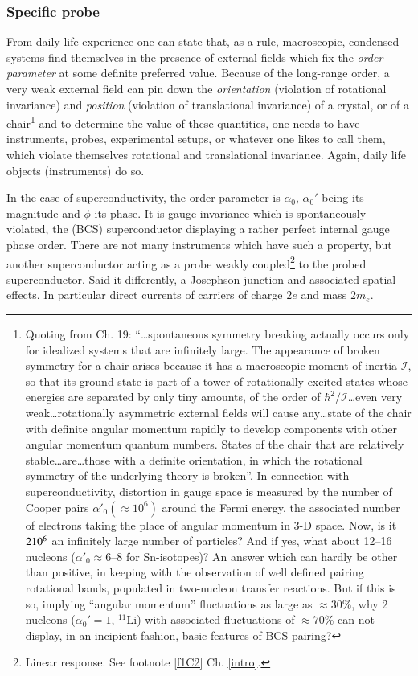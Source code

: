 \subsubsection{Specific probe}
From daily life experience one can state that, as a rule, macroscopic, condensed systems find themselves in the presence of external fields which fix the \textit{order parameter} at some definite preferred value. Because of the long-range order, a very weak external field can pin down the \textit{orientation} (violation of rotational invariance) and \textit{position} (violation of translational invariance) of a crystal, or of a chair\footnote{Quoting from \cite{Weinberg:96b} Ch. 19: ``\dots spontaneous symmetry breaking actually occurs only for idealized systems that are infinitely large. The appearance of broken symmetry for a chair arises because it has a macroscopic moment of inertia $\mathcal I$, so that its ground state is part of a tower of rotationally excited states whose energies are separated by only tiny amounts, of the order of $\hbar^2/\mathcal I$\dots even very weak\dots rotationally asymmetric external fields will cause any\dots state of the chair with definite angular momentum rapidly to develop components with other angular momentum quantum numbers. States of the chair that are relatively stable\dots are\dots those with a definite orientation, in which the rotational symmetry of the underlying theory is broken''. In connection with superconductivity, distortion in gauge space is measured by the number of Cooper pairs $\alpha'_0(\approx10^6)$ around the Fermi energy, the associated number of electrons taking the place of angular momentum in 3-D space. Now, is it $2\text10^6$ an infinitely large number of particles? And if yes, what about 12--16 nucleons ($\alpha'_0\approx6$--8 for Sn-isotopes)? An answer which can hardly be other than positive, in keeping with the observation of well defined pairing rotational bands, populated in two-nucleon transfer reactions. But if this is so, implying ``angular momentum'' fluctuations as large as $\approx30$\%, why 2 nucleons ($\alpha_0'=1$, $^{11}$Li) with associated fluctuations of $\approx70$\% can not display, in an incipient fashion, basic features of BCS pairing?} and to determine the value of these quantities, one needs to have instruments, probes, experimental setups, or whatever one likes to call them, which violate themselves rotational and translational invariance. Again, daily life objects (instruments) do so.


In the case of superconductivity, the order parameter is $\alpha_0$, $\alpha_0'$ being its magnitude and $\phi$ its phase. It is gauge invariance which is spontaneously violated, the (BCS) superconductor displaying a rather perfect internal gauge phase order. There are not many instruments which have such a property, but another superconductor acting as a probe weakly coupled\footnote{Linear response. See footnote \ref{f1C2} Ch. \ref{intro}.} to the probed superconductor. Said it differently, a Josephson junction and associated spatial effects. In particular direct currents of carriers of charge $2e$ and mass $2m_e$.


